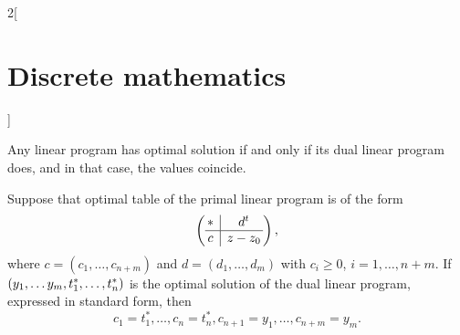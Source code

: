 \documentclass[class=article,10pt,crop=false]{standalone}
\begin{document}
\begin{multicols}{2}[\section{Discrete mathematics}]
\begin{theorem}
Any linear program has optimal solution if and only if its dual linear program does, and in that case, the values coincide.
\end{theorem}
\begin{theorem}
Suppose that optimal table of the primal linear program is of the form $$\left(\begin{array}{@{\,} c|c @{\,}}
    * & d^t\\
    \hline
    c & z-z_0\\
\end{array}\right),$$ where $c=(c_1,\ldots,c_{n+m})$ and $d=(d_1,\ldots,d_m)$ with $c_i\geq0$, $i=1,\ldots,n+m$. If $(y_1,\ldots y_m,t_1^*,\ldots,\\t_n^*)$ is the optimal solution of the dual linear program, expressed in standard form, then $$c_1=t_1^*,\ldots,c_n=t_n^*, c_{n+1}=y_1,\ldots,c_{n+m}=y_m.$$
\end{theorem}
\end{multicols}
\end{document}
